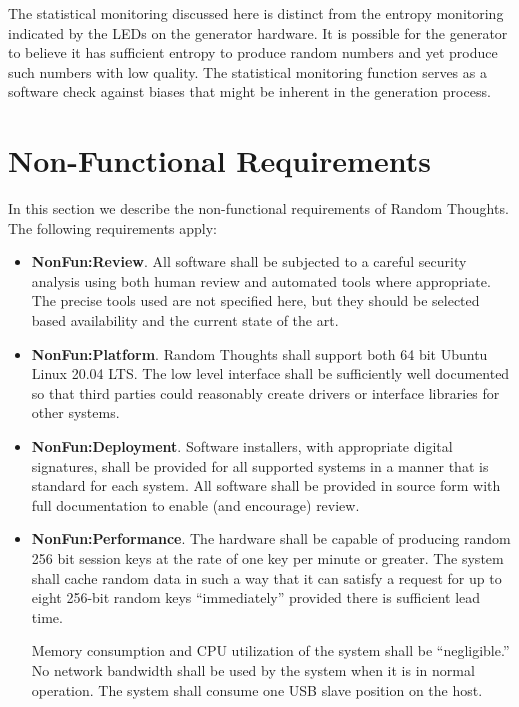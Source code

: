 The statistical monitoring discussed here is distinct from the entropy monitoring indicated by
the LEDs on the generator hardware. It is possible for the generator to believe it has
sufficient entropy to produce random numbers and yet produce such numbers with low quality. The
statistical monitoring function serves as a software check against biases that might be inherent
in the generation process.

\section{Non-Functional Requirements}
\label{sec:non-functional}

In this section we describe the non-functional requirements of Random Thoughts. The following
requirements apply:

\begin{itemize}

\item \textbf{NonFun:Review}. All software shall be subjected to a careful security analysis
  using both human review and automated tools where appropriate. The precise tools used are not
  specified here, but they should be selected based availability and the current state of the
  art.

\item \textbf{NonFun:Platform}. Random Thoughts shall support both 64 bit Ubuntu Linux 20.04
  LTS. The low level interface shall be sufficiently well documented so that third parties could
  reasonably create drivers or interface libraries for other systems.

\item \textbf{NonFun:Deployment}. Software installers, with appropriate digital signatures,
  shall be provided for all supported systems in a manner that is standard for each system.
  All software shall be provided in source form with full documentation to enable (and
  encourage) review.

\item \textbf{NonFun:Performance}. The hardware shall be capable of producing random 256 bit
  session keys at the rate of one key per minute or greater. The system shall cache random data
  in such a way that it can satisfy a request for up to eight 256-bit random keys
  ``immediately'' provided there is sufficient lead time.

  Memory consumption and CPU utilization of the system shall be ``negligible.'' No network
  bandwidth shall be used by the system when it is in normal operation. The system shall consume
  one USB slave position on the host.


\end{itemize}
